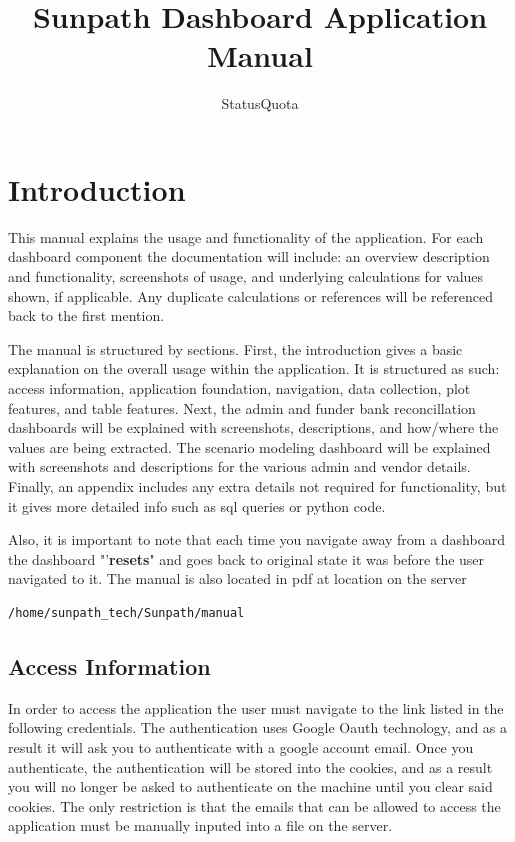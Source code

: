 \documentclass[titlepage]{article}
\author{StatusQuota}
\title{Sunpath Dashboard Application Manual}
\begin{document}
\maketitle
\tableofcontents
\newpage
\section{Introduction}
This manual explains the usage and functionality of the application. For each dashboard component the documentation will include: an overview description and functionality, screenshots of usage, and underlying calculations for values shown, if applicable. Any duplicate calculations or references will be referenced back to the first mention. 

The manual is structured by sections. First, the introduction gives a basic explanation on the overall usage within the application. It is structured as such: access information, application foundation, navigation, data collection, plot features, and table features. Next, the admin and funder bank reconcillation dashboards will be explained with screenshots, descriptions, and how/where the values are being extracted. The scenario modeling dashboard will be explained with screenshots and descriptions for the various admin and vendor details. Finally, an appendix includes any extra details not required for functionality, but it gives more detailed info such as sql queries or python code. 

Also, it is important to note that each time you navigate away from a dashboard the dashboard "'\textbf{resets}" and goes back to original state it was before the user navigated to it. The manual is also located in pdf at location on the server 
\begin{verbatim}
/home/sunpath_tech/Sunpath/manual
\end{verbatim}

\subsection{Access Information}
In order to access the application the user must navigate to the link listed in the following credentials.  The authentication uses Google Oauth technology, and as a result it will ask you to authenticate with a google account email. Once you authenticate, the authentication will be stored into the cookies, and as a result you will no longer be asked to authenticate on the machine until you clear said cookies. The only restriction is that the emails that can be allowed to access the application must be manually inputed into a file on the server. 
\end{document}
